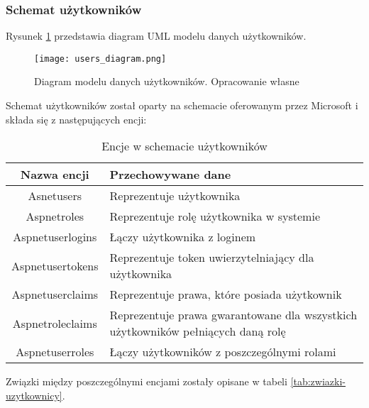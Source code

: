     \newpage
\subsubsection{Schemat użytkowników}

Rysunek \ref{fig:diagram-uzytkownicy} przedstawia diagram UML modelu danych użytkowników. 

\begin{figure}[H]
    \centering
    \texttt{[image: users\_diagram.png]}
    \caption{Diagram modelu danych użytkowników. Opracowanie własne}
    \label{fig:diagram-uzytkownicy}
\end{figure}

Schemat użytkowników został oparty na schemacie oferowanym przez Microsoft 
\parencite{vickers2021} i składa się z następujących encji:

    \begin{xltabular}{1\textwidth} { 
        | >{\raggedright\arraybackslash}c        
        | >{\raggedright\arraybackslash}X | }
        \caption{Encje w schemacie użytkowników} \label{tab:encje-uzytkownicy}\\
        \hline
       Nazwa encji & Przechowywane dane \\
       \hline
       Asnetusers & Reprezentuje użytkownika \\
       \hline
       Aspnetroles & Reprezentuje rolę użytkownika w systemie \\
       \hline
       Aspnetuserlogins & Łączy użytkownika z loginem \\
       \hline
       Aspnetusertokens & Reprezentuje token uwierzytelniający dla użytkownika \\
       \hline
       Aspnetuserclaims & Reprezentuje prawa, które posiada użytkownik \\
       \hline
       Aspnetroleclaims & Reprezentuje prawa gwarantowane dla wszystkich użytkowników
       pełniących daną rolę \\
       \hline
       Aspnetuserroles & Łączy użytkowników z poszczególnymi rolami \\
       \hline
    \end{xltabular}

Związki między poszczególnymi encjami zostały opisane w tabeli \ref{tab:zwiazki-uzytkownicy}.

